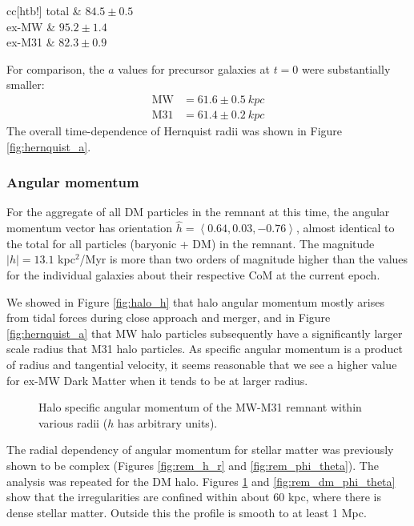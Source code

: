 \documentclass[twocolumn]{aastex63}
\begin{document}
\begin{deluxetable}{cc}[htb!]
	\tablewidth{0pt}
	\startdata
	total &  $84.5 \pm 0.5$  \\
	ex-MW &   $95.2 \pm 1.4$  \\
	ex-M31 &   $82.3 \pm 0.9$
	\enddata
\end{deluxetable}

For comparison, the $a$ values for precursor galaxies at $t=0$ were substantially smaller:
\begin{align*}
\text{MW} &= 61.6 \pm 0.5\ kpc\\
\text{M31} &= 61.4 \pm 0.2\ kpc
\end{align*}
The overall time-dependence of Hernquist radii was shown in Figure \ref{fig:hernquist_a}.


\subsubsection{Angular momentum}
\label{sec:rem_halo_spin}

For the aggregate of all DM particles in the remnant at this time, the angular momentum vector has orientation $\hat{h} = \left< 0.64 ,  0.03, -0.76 \right>$, almost identical to the total for all particles (baryonic + DM) in the remnant. The magnitude $|h| = 13.1$ kpc$^2$/Myr is more than two orders of magnitude higher than the values for the individual galaxies about their respective CoM at the current epoch. 

We showed in Figure \ref{fig:halo_h} that halo angular momentum mostly arises from tidal forces during close approach and merger, and in Figure \ref{fig:hernquist_a} that MW halo particles subsequently have a significantly larger scale radius that M31 halo particles. As specific angular momentum is a product of radius and tangential velocity, it seems reasonable that we see a higher value for ex-MW Dark Matter when it tends to be at larger radius. 

\begin{figure}[htb!]
	\caption{Halo specific angular momentum of the MW-M31 remnant within various radii ($h$ has arbitrary units).
		\label{fig:rem_dm_h_r}}
\end{figure}

The radial dependency of angular momentum for stellar matter was previously shown to be complex (Figures \ref{fig:rem_h_r} and \ref{fig:rem_phi_theta}). The analysis was repeated for the DM halo. Figures \ref{fig:rem_dm_h_r} and \ref{fig:rem_dm_phi_theta} show that the irregularities are confined within about 60 kpc, where there is dense stellar matter. Outside this the profile is smooth to at least 1 Mpc.
	
\end{document}
